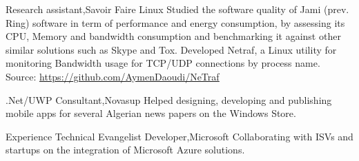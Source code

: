     \resumeSubheading
    {Research assistant,}{Savoir Faire Linux}{}{}
      \resumeItemListStart
        \renewcommand{\labelitemii}{\raisebox{.45cm}{$\bullet$}}
          {Studied the software quality of Jami (prev. Ring) software in term of performance and energy consumption, by assessing 
          its CPU, Memory and bandwidth consumption and benchmarking it against other similar solutions such as Skype and Tox.}
          \renewcommand{\labelitemii}{\raisebox{.25cm}{$\bullet$}}
          {Developed Netraf, a Linux utility for monitoring Bandwidth usage for TCP/UDP connections by process name.
          Source: \underline{\url{https://github.com/AymenDaoudi/NeTraf}}}
        \renewcommand{\labelitemii}{\scriptsize \raisebox{.0cm}{\ding{118}}}
      \resumeItemListEnd 

    \resumeSubheading
    {.Net/UWP Consultant,}{Novasup}{}{}
      \resumeItemListStart
      \renewcommand{\labelitemii}{\raisebox{.2cm}{$\bullet$}}
          {Helped designing, developing and publishing mobile apps for several Algerian news papers on the Windows Store.}
        \renewcommand{\labelitemii}{\scriptsize \raisebox{.0cm}{\ding{118}}}
      \resumeItemListEnd 
    
    \resumeSubheading
    {Experience Technical Evangelist Developer,}{Microsoft}{}{}
      \resumeItemListStart
      \renewcommand{\labelitemii}{\raisebox{.19cm}{$\bullet$}}
          {Collaborating with ISVs and startups on the integration of Microsoft Azure solutions.}
        \renewcommand{\labelitemii}{\scriptsize \raisebox{.0cm}{\ding{118}}}
      \resumeItemListEnd

